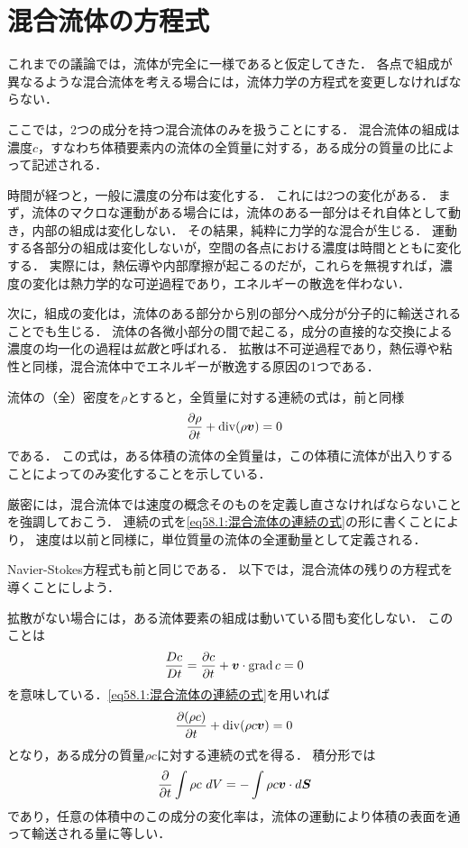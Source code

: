 \section{混合流体の方程式}

これまでの議論では，流体が完全に一様であると仮定してきた．
各点で組成が異なるような混合流体を考える場合には，流体力学の方程式を変更しなければならない．


ここでは，2つの成分を持つ混合流体のみを扱うことにする．
混合流体の組成は濃度$c$，すなわち体積要素内の流体の全質量に対する，ある成分の質量の比によって記述される．


時間が経つと，一般に濃度の分布は変化する．
これには2つの変化がある．
まず，流体のマクロな運動がある場合には，流体のある一部分はそれ自体として動き，内部の組成は変化しない．
その結果，純粋に力学的な混合が生じる．
運動する各部分の組成は変化しないが，空間の各点における濃度は時間とともに変化する．
実際には，熱伝導や内部摩擦が起こるのだが，これらを無視すれば，濃度の変化は熱力学的な可逆過程であり，エネルギーの散逸を伴わない．

次に，組成の変化は，流体のある部分から別の部分へ成分が分子的に輸送されることでも生じる．
流体の各微小部分の間で起こる，成分の直接的な交換による濃度の均一化の過程は\emph{拡散}と呼ばれる．
拡散は不可逆過程であり，熱伝導や粘性と同様，混合流体中でエネルギーが散逸する原因の1つである．


流体の（全）密度を$\rho$とすると，全質量に対する連続の式は，前と同様
\begin{equation}\label{eq58.1:混合流体の連続の式}
    \pdv{\rho}{t} + \operatorname{div}(\rho\vb*{v}) = 0
\end{equation}
である．
この式は，ある体積の流体の全質量は，この体積に流体が出入りすることによってのみ変化することを示している．

厳密には，混合流体では速度の概念そのものを定義し直さなければならないことを強調しておこう．
連続の式を\eqref{eq58.1:混合流体の連続の式}の形に書くことにより，
速度は以前と同様に，単位質量の流体の全運動量として定義される．

Navier-Stokes方程式も前と同じである．
以下では，混合流体の残りの方程式を導くことにしよう．


拡散がない場合には，ある流体要素の組成は動いている間も変化しない．
このことは
\[
    \frac{Dc}{Dt} = \pdv{c}{t} + \vb*{v} \cdot \operatorname{grad} c = 0
\]
を意味している．\eqref{eq58.1:混合流体の連続の式}を用いれば
\[
    \pdv{(\rho c)}{t} + \operatorname{div}(\rho c\vb*{v}) = 0
\]
となり，ある成分の質量$\rho c$に対する連続の式を得る．
積分形では
\[
    \pdv{t} \int \rho c \, \, dV = - \int \rho c\vb*{v} \cdot d\vb*{S} 
\]
であり，任意の体積中のこの成分の変化率は，流体の運動により体積の表面を通って輸送される量に等しい．


